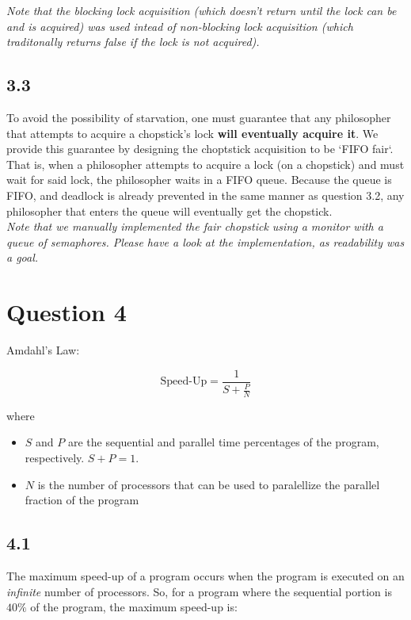 \documentclass[11pt, letterpaper]{article}
\begin{document}
\textit{Note that the blocking lock acquisition (which doesn't return until the lock can be and is acquired) was used intead of non-blocking lock acquisition (which traditonally returns false if the lock is not acquired).}

\subsection*{3.3}

To avoid the possibility of starvation, one must guarantee that any philosopher that attempts to acquire a chopstick's lock \textbf{will eventually acquire it}. We provide this guarantee by designing the choptstick acquisition to be `FIFO fair`. That is, when a philosopher attempts to acquire a lock (on a chopstick) and must wait for said lock, the philosopher waits in a FIFO queue. Because the queue is FIFO, and deadlock is already prevented in the same manner as question 3.2, any philosopher that enters the queue will eventually get the chopstick.\\

\textit{Note that we manually implemented the fair chopstick using a monitor with a queue of semaphores. Please have a look at the implementation, as readability was a goal.}

\pagebreak

\section*{Question 4}

Amdahl's Law:

$$
\text{Speed-Up} = \frac{1}{S + \frac{P}{N}}
$$

where

\begin{itemize}
    \item $S$ and $P$ are the sequential and parallel time percentages of the program, respectively. $S + P = 1$.
    \item $N$ is the number of processors that can be used to paralellize the parallel fraction of the program
\end{itemize}

\subsection*{4.1}

The maximum speed-up of a program occurs when the program is executed on an \textit{infinite} number of processors. So, for a program where the sequential portion is $40\%$ of the program, the maximum speed-up is:
\end{document}
